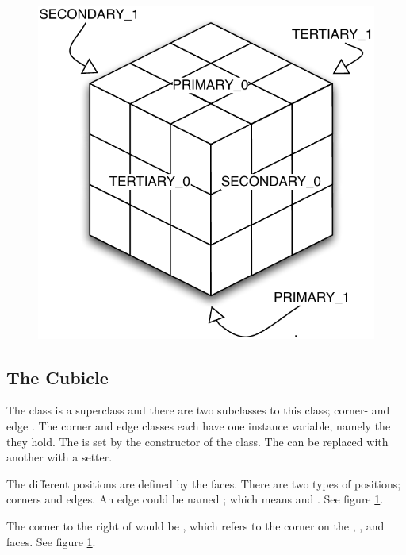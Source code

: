 \begin{figure}[htbp]
	\centering
		\includegraphics[scale=0.5]{input/pics/faceRanking.pdf}
	\caption{}
	\label{fig:faceRanking}
\end{figure}

\subsection{The Cubicle}
\label{sub:cubicle}
The \cubicle{} class is a superclass and there are two subclasses to this class; corner- and edge \cubicle{}.
The corner and edge \cubicle{} classes each have one instance variable, namely the \cubie{} they hold. The \cpiece{} is set by the constructor of the \cubicle{} class. 
The \cubie{} can be replaced with another \cubie{} with a setter. 

The different positions are defined by the faces. There are two types of positions; corners and edges.
An edge \cubicle{} could be named ; which means  and .  See figure \ref{fig:faceRanking}.

The corner to the right of  would be , which refers to the corner on the , , and  faces. See figure \ref{fig:faceRanking}.


